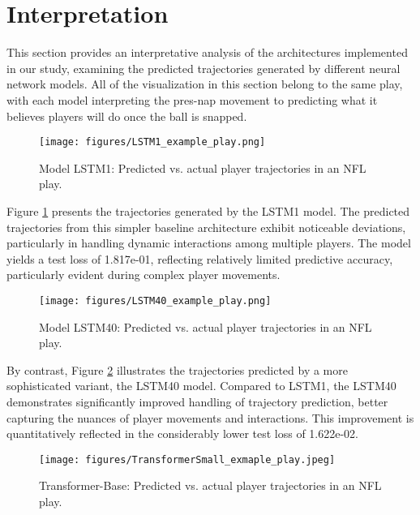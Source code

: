 \documentclass[sigconf]{acmart}
\begin{document}
\section{Interpretation}

This section provides an interpretative analysis of the architectures implemented in our study, examining the predicted trajectories generated by different neural network models. All of the visualization in this section belong to the same play, with each model interpreting the pres-nap movement to predicting what it believes players will do once the ball is snapped.

\begin{figure}[htbp]
  \centering
  \texttt{[image: figures/LSTM1\_example\_play.png]}
  \caption{Model LSTM1: Predicted vs. actual player trajectories in an NFL play.}
  \label{fig:trajectoriesLSTM1}
\end{figure}

Figure \ref{fig:trajectoriesLSTM1} presents the trajectories generated by the LSTM1 model. The predicted trajectories from this simpler baseline architecture exhibit noticeable deviations, particularly in handling dynamic interactions among multiple players. The model yields a test loss of 1.817e-01, reflecting relatively limited predictive accuracy, particularly evident during complex player movements.

\begin{figure}[htbp]
  \centering
  \texttt{[image: figures/LSTM40\_example\_play.png]}
  \caption{Model LSTM40: Predicted vs. actual player trajectories in an NFL play.}
  \label{fig:trajectoriesLSTM40}
\end{figure}

By contrast, Figure \ref{fig:trajectoriesLSTM40} illustrates the trajectories predicted by a more sophisticated variant, the LSTM40 model. Compared to LSTM1, the LSTM40 demonstrates significantly improved handling of trajectory prediction, better capturing the nuances of player movements and interactions. This improvement is quantitatively reflected in the considerably lower test loss of 1.622e-02.

\begin{figure}[htbp]
  \centering
  \texttt{[image: figures/TransformerSmall\_exmaple\_play.jpeg]}
  \caption{Transformer-Base: Predicted vs. actual player trajectories in an NFL play.}
  \label{fig:trajectoriesTSmall}
\end{figure}
\end{document}
